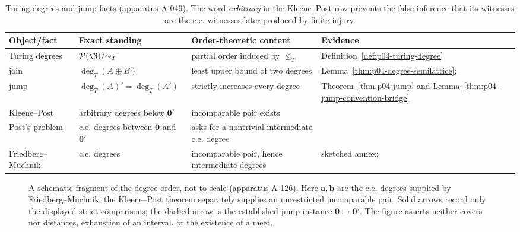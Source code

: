 \begin{table}[htbp]
\centering
\small
\begin{tabular}{@{}p{1.12in}p{1.25in}p{1.30in}p{1.55in}@{}}
\toprule
Object/fact & Exact standing & Order-theoretic content & Evidence \\
\midrule
Turing degrees & \(\mathcal P(\N)/{\sim_T}\) & partial order induced by \(\leq_T\) & Definition~\ref{def:p04-turing-degree} \\
join & \(\deg_T(A\oplus B)\) & least upper bound of two degrees & Lemma~\ref{thm:p04-degree-semilattice}; \cite{KleenePost1954} \\
jump & \(\deg_T(A)'=\deg_T(A')\) & strictly increases every degree & Theorem~\ref{thm:p04-jump} and Lemma~\ref{thm:p04-jump-convention-bridge} \\
Kleene--Post & arbitrary degrees below \(\mathbf0'\) & incomparable pair exists & \cite{KleenePost1954} \\
Post's problem & c.e. degrees between \(\mathbf0\) and \(\mathbf0'\) & asks for a nontrivial intermediate c.e. degree & \cite{Post1944} \\
Friedberg--Muchnik & c.e. degrees & incomparable pair, hence intermediate degrees & sketched annex; \cite{Friedberg1957,Muchnik1956} \\
\bottomrule
\end{tabular}
\caption{Turing degrees and jump facts (apparatus A-049).  The word
\emph{arbitrary} in the
Kleene--Post row prevents the false inference that its witnesses are the c.e.
witnesses later produced by finite injury.}
\label{tab:p04-degree-facts}
\end{table}

\begin{figure}[htbp]
\centering
{}
\caption{A schematic fragment of the degree order, not to scale
(apparatus A-126).  Here \(\mathbf a,\mathbf b\) are the c.e. degrees supplied
by Friedberg--Muchnik; the Kleene--Post theorem separately supplies an
unrestricted incomparable pair.  Solid arrows record only the displayed
strict comparisons; the dashed arrow is the established jump instance
\(\mathbf0\mapsto\mathbf0'\).  The figure asserts neither covers nor
distances, exhaustion of an interval, or the existence of a meet.}
\label{fig:p04-turing-degrees}
\end{figure}

